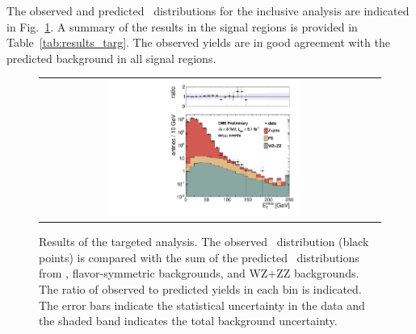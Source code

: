 \clearpage

The observed and predicted \MET\ distributions for the
inclusive analysis are indicated in Fig.~\ref{fig:results_targ}. A summary of the results in the signal regions is provided in
Table~\ref{tab:results_targ}. The observed yields are in good agreement with the predicted background in all signal regions.

\begin{figure}[!h]
\begin{center}
\begin{tabular}{cc}
\includegraphics[width=0.6\textwidth]{plots/met_bveto_0.pdf}
\end{tabular}
\caption{Results of the targeted analysis. The observed \MET\ distribution (black points) is compared with the sum of the predicted \MET\
distributions from \zjets, flavor-symmetric backgrounds, and WZ+ZZ backgrounds. The ratio of observed to predicted yields in each bin is
indicated. The error bars indicate the statistical uncertainty in the data and the shaded band indicates the total background uncertainty.
\label{fig:results_targ}
}
\end{center}
\end{figure}



